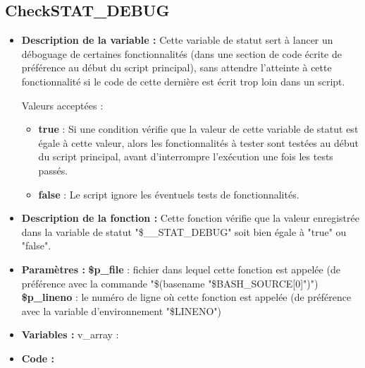 \documentclass[a4paper,10pt]{article}
\begin{document}
\subsection{CheckSTAT\_DEBUG}\color{white}
\begin{itemize}
    \item \textbf{Description de la variable :} Cette variable de statut sert à lancer un déboguage de certaines fonctionnalités (dans une section de code écrite de préférence au début du script principal), sans attendre l'atteinte à cette fonctionnalité si le code de cette dernière est écrit trop loin dans un script.
    
    Valeurs acceptées :
    \begin{itemize}
        \item \textbf{true} : Si une condition vérifie que la valeur de cette variable de statut est égale à cette valeur, alors les fonctionnalités à tester sont testées au début du script principal, avant d'interrompre l'exécution une fois les tests passés.
        \item \textbf{false} : Le script ignore les éventuels tests de fonctionnalités. 
    \end{itemize}

    \item \textbf{Description de la fonction :} Cette fonction vérifie que la valeur enregistrée dans la variable de statut "\$\_\_STAT\_DEBUG" soit bien égale à "true" ou "false".

    \item \textbf{Paramètres :}
        \color{orange}\textbf{\$p\_file}\color{white} : fichier dans lequel cette fonction est appelée (de préférence avec la commande "\$(\color{gray}basename \color{white}"\color{orange}\$BASH\_SOURCE[0]\color{white}")")
    \color{orange}\textbf{\$p\_lineno}\color{white} : le numéro de ligne où cette fonction est appelée (de préférence avec la variable d'environnement "\color{orange}\$LINENO\color{white}")

    \item \textbf{Variables :} v\_array :

    \item \textbf{Code :}
\end{itemize}

\color{green}
\end{document}
